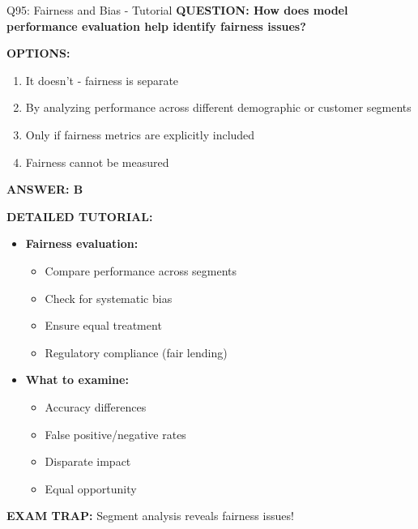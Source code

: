 \documentclass[8pt]{beamer}
\begin{document}
\begin{frame}{Q95: Fairness and Bias - Tutorial}
	\fontsize{6.5}{7.5}\selectfont
	\textbf{QUESTION: How does model performance evaluation help identify fairness issues?}
	
	\vspace{0.1cm}
	\textbf{OPTIONS:}
	\begin{enumerate}
		\item It doesn't - fairness is separate
		\item By analyzing performance across different demographic or customer segments
		\item Only if fairness metrics are explicitly included
		\item Fairness cannot be measured
	\end{enumerate}
	
	\vspace{0.1cm}
	\textcolor{myblue}{\textbf{ANSWER: B}}
	
	\vspace{0.1cm}
	\textbf{DETAILED TUTORIAL:}
	\begin{itemize}
		\item \textbf{Fairness evaluation:}
		\begin{itemize}
			\item Compare performance across segments
			\item Check for systematic bias
			\item Ensure equal treatment
			\item Regulatory compliance (fair lending)
		\end{itemize}
		\item \textbf{What to examine:}
		\begin{itemize}
			\item Accuracy differences
			\item False positive/negative rates
			\item Disparate impact
			\item Equal opportunity
		\end{itemize}
	\end{itemize}
	
	\textcolor{myred}{\textbf{EXAM TRAP:}} Segment analysis reveals \textcolor{myblue}{fairness issues}!
\end{frame}
\end{document}
